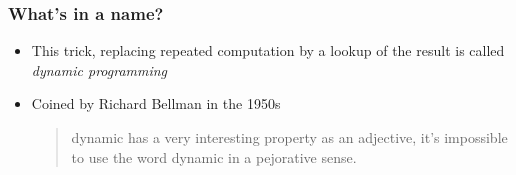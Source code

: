 \documentclass[presentation]{beamer}
\begin{document}
\begin{frame}
  \frametitle{What's in a name?}
  \begin{itemize}
  \item This trick, replacing repeated computation by a lookup of the
    result is called \emph{dynamic programming}
  \item Coined by Richard Bellman in the 1950s
    \begin{quote}
      dynamic {\normalfont[\dots]} has a very interesting property as an adjective,
      {\normalfont[\dots]} it's impossible to use the word dynamic in a pejorative
      sense.
    \end{quote}
  \end{itemize}
\end{frame}


\end{document}
